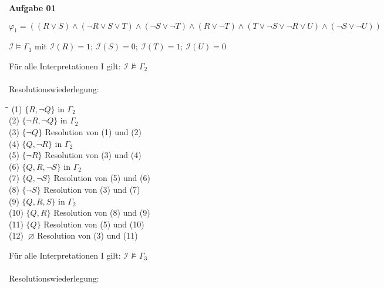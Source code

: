 \documentclass[a4paper,10pt]{article}
\begin{document}
	\parindent0pt
	\textbf{Aufgabe 01}
	\begin{compactenum} [(a)]
		\item $ \varphi_1 = ((R\vee S) \wedge (\lnot R \vee S \vee T) \wedge (\lnot S \vee \lnot T)\wedge (R \vee \lnot T) \wedge (T\vee \lnot S \vee \lnot R \vee U) \wedge (\lnot S \vee \lnot U)) $
		\item \begin{compactitem}
			\item $ \mathcal{I} \models \Gamma_1 $ mit $ \mathcal{I}(R) = 1;\ \mathcal{I}(S) = 0;\ \mathcal{I}(T) = 1;\ \mathcal{I}(U) = 0$
			\item Für alle Interpretationen I gilt: $ \mathcal{I}\not\models\Gamma_2 $ \\ \\
			Resolutionswiederlegung:
			\begin{tabbing}
				\= \qquad \= \qquad\qquad\qquad \= \qquad\qquad \kill
				\>(1) \> $ \{R, \lnot Q\} $ \> in $ \Gamma_2 $ \\
				\>(2) \> $ \{\lnot R, \lnot Q\} $ \> in $ \Gamma_2 $ \\
				\>(3) \> $ \{\lnot Q \} $ \> Resolution von (1) und (2) \\
				\>(4) \> $ \{Q ,\lnot R\} $ \> in $ \Gamma_2 $\\
				\>(5) \> $ \{\lnot R\} $ \> Resolution von (3) und (4) \\
				\>(6) \> $ \{Q, R, \lnot S\} $ \> in $ \Gamma_2 $\\
				\>(7) \> $ \{Q, \lnot S\} $ \> Resolution von (5) und (6) \\
				\>(8) \> $ \{\lnot S\} $ \> Resolution von (3) und (7) \\
				\>(9) \> $ \{Q, R, S\} $ \> in $ \Gamma_2 $ \\
				\>(10) \> $ \{Q, R\} $ \> Resolution von (8) und (9) \\
				\>(11) \> $ \{Q\} $ \> Resolution von (5) und (10)\\
				\>(12) \> $ \ \varnothing $ \> Resolution von (3) und (11) \\
			\end{tabbing}
			\item Für alle Interpretationen I gilt: $ \mathcal{I}\not\models\Gamma_3 $ \\ \\
			Resolutionswiederlegung:
			

\end{compactitem}
\end{compactenum}
\end{document}
